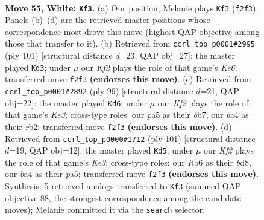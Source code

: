 \documentclass[11pt]{article}
\begin{document}
\clearpage

\begin{figure}[p]\centering
\begin{subfigure}{0.46\textwidth}\centering
\resizebox{\linewidth}{!}{%
\newchessgame
\chessboard[
  setfen={8/5k2/1R6/pp4r1/b1p5/P1P5/1B3K2/8 w - - 16 55},
  showmover=false,
  pgfstyle=straightmove, color=movearrow, markmove={f2-f3}
]}
\caption{}
\end{subfigure}\hfill
\begin{subfigure}{0.46\textwidth}\centering
\resizebox{\linewidth}{!}{%
\newchessgame
\chessboard[
  setfen={8/8/5R2/7p/1B4bP/P1P1k1P1/r7/6K1 b - - 26 51},
  showmover=false,
  pgfstyle=straightmove, color=movearrow, markmove={e3-d3}
]}
\caption{}
\end{subfigure}
\\[4pt]
\begin{subfigure}{0.46\textwidth}\centering
\resizebox{\linewidth}{!}{%
\newchessgame
\chessboard[
  setfen={8/pB6/4k3/rP6/7p/6bP/1R2K1P1/8 b - - 2 50},
  showmover=false,
  pgfstyle=straightmove, color=movearrow, markmove={e6-d6}
]}
\caption{}
\end{subfigure}\hfill
\begin{subfigure}{0.46\textwidth}\centering
\resizebox{\linewidth}{!}{%
\newchessgame
\chessboard[
  setfen={3B4/8/4kpp1/P6p/4b2P/2R3P1/r7/4K3 b - - 2 51},
  showmover=false,
  pgfstyle=straightmove, color=movearrow, markmove={e6-d5}
]}
\caption{}
\end{subfigure}
\caption{\textbf{Move 55, White: \texttt{Kf3}.} (a) Our position; Melanie plays \texttt{Kf3} (\texttt{f2f3}). Panels (b)--(d) are the retrieved master positions whose correspondence most drove this move (highest QAP objective among those that transfer to it). (b) Retrieved from \texttt{ccrl\_top\_p0001\#2995} (ply 101) [structural distance $d$=23, QAP obj=27]: the master played \texttt{Kd3}; under $\mu$ our \emph{Kf2} plays the role of that game's \emph{Ke6}; transferred move \texttt{f2f3} \textbf{(endorses this move)}. (c) Retrieved from \texttt{ccrl\_top\_p0001\#2892} (ply 99) [structural distance $d$=21, QAP obj=22]: the master played \texttt{Kd6}; under $\mu$ our \emph{Kf2} plays the role of that game's \emph{Ke3}; cross-type roles: our \emph{p}a5 as their \emph{b}b7, our \emph{b}a4 as their \emph{r}b2; transferred move \texttt{f2f3} \textbf{(endorses this move)}. (d) Retrieved from \texttt{ccrl\_top\_p0000\#1712} (ply 101) [structural distance $d$=19, QAP obj=12]: the master played \texttt{Kd5}; under $\mu$ our \emph{Kf2} plays the role of that game's \emph{Ke3}; cross-type roles: our \emph{R}b6 as their \emph{b}d8, our \emph{b}a4 as their \emph{p}a5; transferred move \texttt{f2f3} \textbf{(endorses this move)}. Synthesis: 5 retrieved analogs transferred to \texttt{Kf3} (summed QAP objective 88, the strongest correspondence among the candidate moves); Melanie committed it via the \texttt{search} selector.}
\label{fig:thought-m108}
\end{figure}
\end{document}
